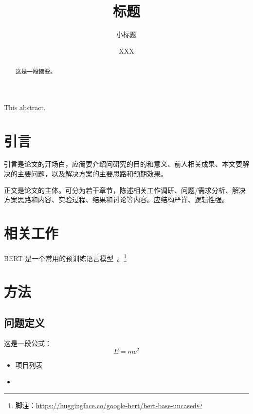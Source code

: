 \documentclass[12pt]{ctexart}
\title{标题}
\subtitle{小标题}
\author{XXX}
\begin{document}
\maketitle
\makedeclare


\newpage
\begin{abstract}
这是一段摘要。
\end{abstract}

\begin{enabstract}
This abstract.
\end{enabstract}
\newpage

\tableofcontents
\newpage

\makedoc

\section{引言}

引言是论文的开场白，应简要介绍问研究的目的和意义、前人相关成果、本文要解决的主要问题，以及解决方案的主要思路和预期效果。

正文是论文的主体。可分为若干章节，陈述相关工作调研、问题/需求分析、解决方案思路和内容、实验过程、结果和讨论等内容。应结构严谨、逻辑性强。

\section{相关工作}

BERT 是一个常用的预训练语言模型~\cite{devlin2018bert}。\footnote{脚注：\url{https://huggingface.co/google-bert/bert-base-uncased}}

\section{方法}

\subsection{问题定义}

这是一段公式：
\begin{equation}
    E = mc^2
\end{equation}

\begin{itemize}
    \item 项目列表
    \item
\end{itemize}
\end{document}
